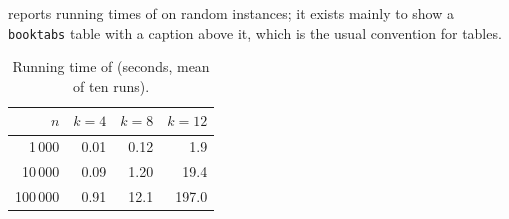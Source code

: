  reports running times of  on random instances; it exists mainly to show a \texttt{booktabs} table with a caption above it, which is the usual convention for tables.

\begin{table}[htb]
    \centering
    \caption{Running time of  (seconds, mean of ten runs).}
    \label{tab:experiments}
    \begin{tabular}{@{}rrrr@{}}
        \toprule
        $n$ & $k=4$ & $k=8$ & $k=12$ \\
        \midrule
        1\,000  & 0.01 & 0.12 & 1.9 \\
        10\,000 & 0.09 & 1.20 & 19.4 \\
        100\,000 & 0.91 & 12.1 & 197.0 \\
        \bottomrule
    \end{tabular}
\end{table}
